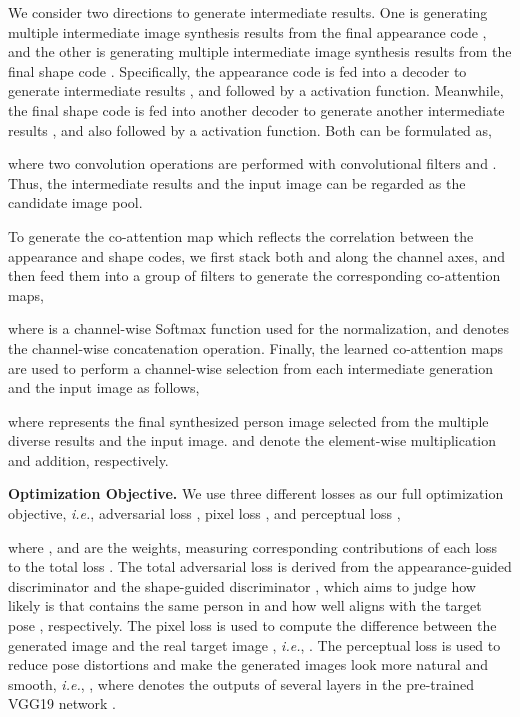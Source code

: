 \documentclass[runningheads]{llncs}
\begin{document}
We consider two directions to generate intermediate results.
One is generating multiple intermediate image synthesis results from the final appearance code , and the other is generating multiple intermediate image synthesis results from the final shape code .
Specifically, the appearance code  is fed into a decoder to generate  intermediate results , and followed by a  activation function.
Meanwhile, the final shape code  is fed into another decoder to generate another  intermediate results , and also followed by a  activation function.
Both can be formulated as,

where two convolution operations are performed with  convolutional filters  and .
Thus, the  intermediate results and the input image  can be regarded as the candidate image pool.

To generate the co-attention map which reflects the correlation between the appearance  and shape  codes, we first stack both  and  along the channel axes, and then feed them into a group of filters  to generate the corresponding  co-attention maps,

where  is a channel-wise Softmax function used for the normalization, and  denotes the channel-wise concatenation operation.
Finally, the learned co-attention maps are used to perform a channel-wise selection from each intermediate generation and the input image as follows,

where  represents the final synthesized person image selected from the multiple diverse results and the input image.  and  denote the element-wise multiplication and addition, respectively. 

\noindent \textbf{Optimization Objective.}
We use three different losses as our full optimization objective, \emph{i.e.}, adversarial loss , pixel loss , and perceptual loss ,

where ,  and  are the weights, measuring corresponding contributions of each loss to the total loss .
The total adversarial loss is derived from the appearance-guided discriminator  and the shape-guided discriminator , which aims to judge how likely is that  contains the same person in  and how well  aligns with the target pose , respectively.
The  pixel loss is used to compute the difference between the generated image  and the real target image , \emph{i.e.}, .
The perceptual loss  is used to reduce pose distortions and make the generated images look more natural and smooth, \emph{i.e.}, , where  denotes the outputs of several layers in the pre-trained VGG19 network \cite{simonyan2014very}.
\end{document}
